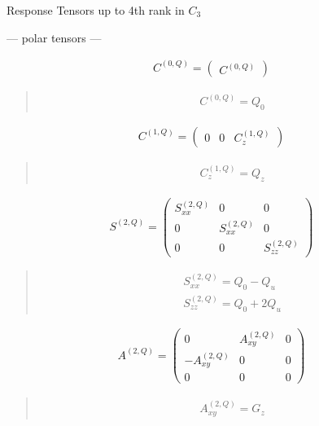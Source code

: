 \documentclass[fleqn,10pt]{jsarticle}
\begin{document}
\setcounter{MaxMatrixCols}{16}

\begin{center}
\LARGE
Response Tensors up to 4th rank in $C_{3}$
\end{center}
\begin{center}\LARGE --- polar tensors ---\end{center}
\begin{align*}
C^{(0,Q)} = \begin{pmatrix} C^{(0,Q)} \end{pmatrix}
\end{align*}
\begin{quote}
\begin{align*}
& C^{(0,Q)} = Q_{0}
\end{align*}
\end{quote}
\begin{align*}
C^{(1,Q)} = \begin{pmatrix} 0 & 0 & C^{(1,Q)}_{z} \end{pmatrix}
\end{align*}
\begin{quote}
\begin{align*}
& C^{(1,Q)}_{z} = Q_{z}
\end{align*}
\end{quote}
\begin{align*}
S^{(2,Q)} = \begin{pmatrix} S^{(2,Q)}_{xx} & 0 & 0 \\ 0 & S^{(2,Q)}_{xx} & 0 \\ 0 & 0 & S^{(2,Q)}_{zz} \end{pmatrix}
\end{align*}
\begin{quote}
\begin{align*}
& S^{(2,Q)}_{xx} = Q_{0} - Q_{u} \\
& S^{(2,Q)}_{zz} = Q_{0} + 2 Q_{u}
\end{align*}
\end{quote}
\begin{align*}
A^{(2,Q)} = \begin{pmatrix} 0 & A^{(2,Q)}_{xy} & 0 \\ - A^{(2,Q)}_{xy} & 0 & 0 \\ 0 & 0 & 0 \end{pmatrix}
\end{align*}
\begin{quote}
\begin{align*}
& A^{(2,Q)}_{xy} = G_{z}
\end{align*}
\end{quote}
\end{document}
